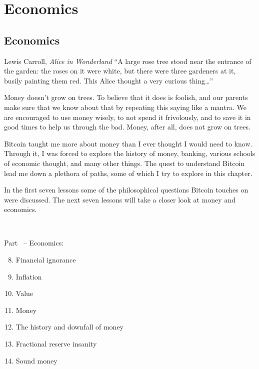 \part{Economics}
\label{ch:economics}
\chapter*{Economics}

\begin{chapquote}{Lewis Carroll, \textit{Alice in Wonderland}}
\enquote{A large rose tree stood near the entrance of the garden: the roses on it were
white, but there were three gardeners at it, busily painting them red. This
Alice thought a very curious thing\ldots}
\end{chapquote}

Money doesn’t grow on trees. To believe that it does is foolish, and our
parents make sure that we know about that by repeating this saying like a
mantra. We are encouraged to use money wisely, to not spend it frivolously,
and to save it in good times to help us through the bad. Money, after all,
does not grow on trees.

Bitcoin taught me more about money than I ever thought I would need to know.
Through it, I was forced to explore the history of money, banking, various
schools of economic thought, and many other things. The quest to understand
Bitcoin lead me down a plethora of paths, some of which I try to explore in
this chapter.

In the first seven lessons some of the philosophical questions Bitcoin touches
on were discussed. The next seven lessons will take a closer look at money and
economics.

~

\begin{samepage}
Part~\ref{ch:economics} -- Economics:

\begin{enumerate}
  \setcounter{enumi}{7}
  \item Financial ignorance
  \item Inflation
  \item Value
  \item Money
  \item The history and downfall of money
  \item Fractional reserve insanity
  \item Sound money
\end{enumerate}
\end{samepage}


